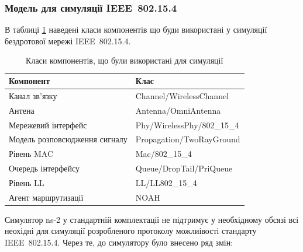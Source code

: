 \documentclass[a4paper,ukrainian,utf8,nocolumnsxix,floatsection,equationsection]{eskdtext}
\renewcommand\paragraph{\subsubsection}
\newcommand{\iee}[0]{IEEE~802.15.4\xspace}
\begin{document}
\paragraph{Модель для симуляції \iee}

В таблиці \ref{tbl:simulation_classes} наведені класи компонентів що буди використані у симуляції бездротової мережі \iee.

\begin{table}[htbp]
\caption{Класи компонентів, що були використані для симуляції}
\centering
\begin{tabular}{|l|l|}
\hline
Компонент                     & Клас                       \\ \hline
Канал зв’язку                 & Channel/WirelessChannel    \\ \hline
Антена                        & Antenna/OmniAntenna        \\ \hline
Мережевий інтерфейс           & Phy/WirelessPhy/802\_15\_4 \\ \hline
Модель розповсюдження сигналу & Propagation/TwoRayGround   \\ \hline
Рівень MAC                    & Mac/802\_15\_4             \\ \hline
Очередь інтерфейсу            & Queue/DropTail/PriQueue    \\ \hline
Рівень LL                     & LL/LL802\_15\_4            \\ \hline
Агент маршрутизації           & NOAH                       \\ \hline
\end{tabular}
\label{tbl:simulation_classes}
\end{table}

Симулятор ns-2 у стандартній комплектації не підтримує у необхідному обсязі всі неохідні для симуляції розробленого протоколу можлиівості стандарту \iee. Через те, до симулятору було внесено ряд змін:
\end{document}
